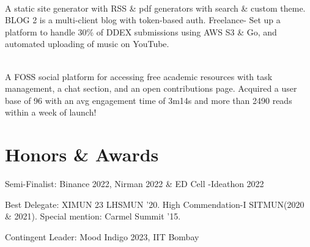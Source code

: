 \documentclass[]{assets/deedy-resume-openfont}
\begin{document}
\hfill {}\\
A static site generator with RSS \& pdf generators with search \& custom theme. BLOG 2 is a multi-client blog with token-based auth. Freelance- Set up a platform to handle 30\% of DDEX submissions using AWS S3 \& Go, and automated uploading of music on YouTube.\\
\sectionsep


\hfill {}\\
A FOSS social platform for accessing free academic resources with task management, a chat section, and an open contributions page. Acquired a user base of 96 with an avg engagement time of 3m14s and more than 2490 reads within a week of launch!\\

\sectionsep
%
%
\section{Honors \& Awards}
\begin{tightemize}  
\item Semi-Finalist: Binance 2022, Nirman 2022 \& ED Cell -Ideathon 2022 \\
\item Best Delegate: XIMUN 23 LHSMUN '20. High Commendation-I SITMUN(2020 \& 2021). Special mention: Carmel Summit '15. \\
\item Contingent Leader: Mood Indigo 2023, IIT Bombay\\
\end{tightemize}
\end{document}

